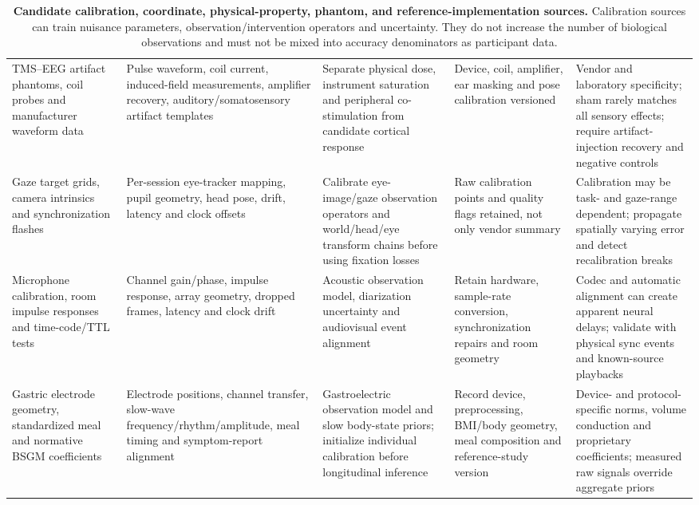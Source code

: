 \begin{table}[!h]
\begin{tabularx}{\textwidth}{@{}p{}p{}p{}p{}X@{}}
TMS--EEG artifact phantoms, coil probes and manufacturer waveform data &
Pulse waveform, coil current, induced-field measurements, amplifier recovery,
auditory/somatosensory artifact templates &
Separate physical dose, instrument saturation and peripheral co-stimulation
from candidate cortical response &
Device, coil, amplifier, ear masking and pose calibration versioned &
Vendor and laboratory specificity; sham rarely matches all sensory effects;
require artifact-injection recovery and negative controls\\

Gaze target grids, camera intrinsics and synchronization flashes &
Per-session eye-tracker mapping, pupil geometry, head pose, drift, latency and
clock offsets &
Calibrate eye-image/gaze observation operators and world/head/eye transform
chains before using fixation losses &
Raw calibration points and quality flags retained, not only vendor summary &
Calibration may be task- and gaze-range dependent; propagate spatially varying
error and detect recalibration breaks\\

Microphone calibration, room impulse responses and time-code/TTL tests &
Channel gain/phase, impulse response, array geometry, dropped frames, latency
and clock drift &
Acoustic observation model, diarization uncertainty and audiovisual event
alignment &
Retain hardware, sample-rate conversion, synchronization repairs and room
geometry &
Codec and automatic alignment can create apparent neural delays; validate with
physical sync events and known-source playbacks\\

Gastric electrode geometry, standardized meal and normative BSGM coefficients &
Electrode positions, channel transfer, slow-wave frequency/rhythm/amplitude,
meal timing and symptom-report alignment &
Gastroelectric observation model and slow body-state priors; initialize
individual calibration before longitudinal inference &
Record device, preprocessing, BMI/body geometry, meal composition and
reference-study version &
Device- and protocol-specific norms, volume conduction and proprietary
coefficients; measured raw signals override aggregate priors\\
\bottomrule
\end{tabularx}
\caption{\textbf{Candidate calibration, coordinate, physical-property, phantom,
and reference-implementation sources.} Calibration sources can train nuisance
parameters, observation/intervention operators and uncertainty. They do not
increase the number of biological observations and must not be mixed into
accuracy denominators as participant data.}
\label{tab:appendix-calibration-sources}
\end{table}

